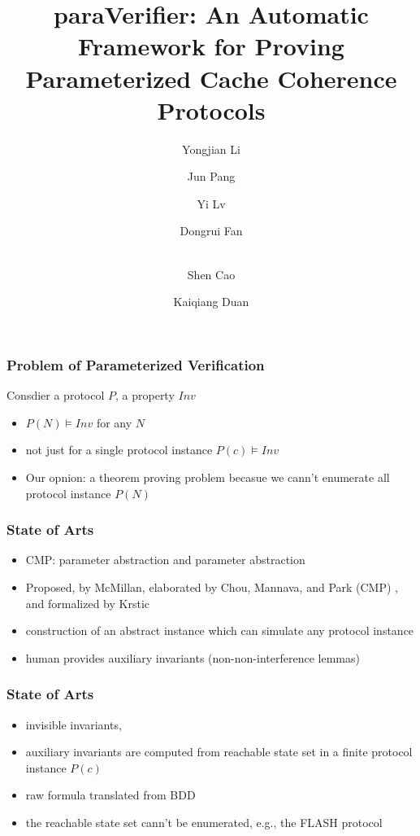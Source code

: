 \documentclass{beamer}
\begin{document}


\title{ {\sf paraVerifier}: An Automatic Framework for Proving Parameterized Cache Coherence Protocols}

\author{Yongjian Li \and Jun Pang \and Yi Lv
\and Dongrui Fan \and \\ Shen Cao \and Kaiqiang Duan}


\frame{\titlepage}

\begin{frame}\frametitle{Problem of Parameterized Verification}
Consdier a protocol $P$, a property $Inv$
\begin{itemize}
\item  $P(N) \models Inv$ for any $N$
\item not just for a single protocol instance  $P(c)\models Inv$
\item Our opnion: a theorem proving problem becasue we cann't enumerate all protocol instance $P(N)$
\end{itemize}
\end{frame}

\begin{frame}\frametitle{State of Arts}
\begin{itemize}
\item CMP:  parameter abstraction and parameter abstraction
\item Proposed, by McMillan, elaborated by Chou, Mannava, and Park (CMP) , and formalized
by Krstic
\item construction of an abstract instance which can simulate any protocol instance
\item human provides auxiliary invariants (non-non-interference lemmas)
\end{itemize}
\end{frame}


\begin{frame}\frametitle{State of Arts }
\begin{itemize}
\item  invisible invariants,
\item  auxiliary invariants are computed from reachable state set in a finite protocol
instance $P(c)$
\item raw formula translated from BDD
\item  the reachable state set cann't be enumerated, e.g., the FLASH protocol
\end{itemize}
\end{frame}
\end{document}
